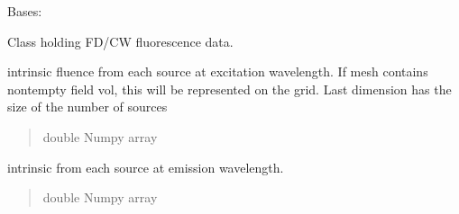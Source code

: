 \documentclass[letterpaper,10pt,english]{sphinxmanual}
\begin{document}
\begin{fulllineitems}
\label{\detokenize{_autosummary/nirfasterff.base.data.FLdata:nirfasterff.base.data.FLdata}}
\pysigstartsignatures
\pysigline
{}
\pysigstopsignatures
\sphinxAtStartPar
Bases: 

\sphinxAtStartPar
Class holding FD/CW fluorescence data.

\begin{fulllineitems}
\label{\detokenize{_autosummary/nirfasterff.base.data.FLdata:nirfasterff.base.data.FLdata.phix}}
\pysigstartsignatures
\pysigline
{}
\pysigstopsignatures
\sphinxAtStartPar
intrinsic fluence from each source at excitation wavelength. If mesh contains non\sphinxhyphen{}tempty field vol, this will be represented on the grid. Last dimension has the size of the number of sources
\begin{quote}\begin{description}
\sphinxAtStartPar
double Numpy array

\end{description}\end{quote}

\end{fulllineitems}


\begin{fulllineitems}
\label{\detokenize{_autosummary/nirfasterff.base.data.FLdata:nirfasterff.base.data.FLdata.phimm}}
\pysigstartsignatures
\pysigline
{}
\pysigstopsignatures
\sphinxAtStartPar
intrinsic from each source at emission wavelength.
\begin{quote}\begin{description}
\sphinxAtStartPar
double Numpy array

\end{description}\end{quote}

\end{fulllineitems}



\end{fulllineitems}
\end{document}
